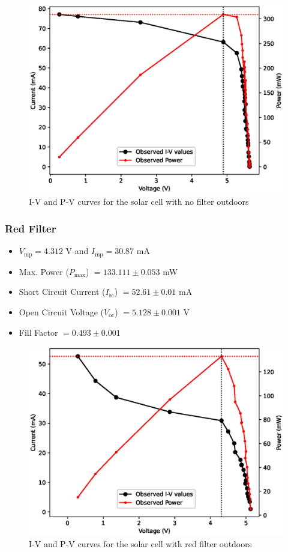 \begin{figure}[H]
    \centering
    \includegraphics[width=1\columnwidth]{images/out/no.eps}
    \caption{I-V and P-V curves for the solar cell with no filter outdoors}
\end{figure}


\subsubsection{Red Filter}
\begin{itemize}
    \item $V_\text{mp} = 4.312$ V and $I_\text{mp} = 30.87$ mA
    \item Max. Power ($P_\text{max}$) $= 133.111 \pm 0.053 $ mW
    \item Short Circuit Current ($I_\text{sc}$) $= 52.61 \pm 0.01$ mA
    \item Open Circuit Voltage ($V_\text{oc}$) $= 5.128 \pm 0.001$ V
    \item Fill Factor $= 0.493 \pm 0.001$
\end{itemize}

\begin{figure}[H]
    \centering
    \includegraphics[width=1\columnwidth]{images/out/red.eps}
    \caption{I-V and P-V curves for the solar cell with red filter outdoors}
\end{figure}

